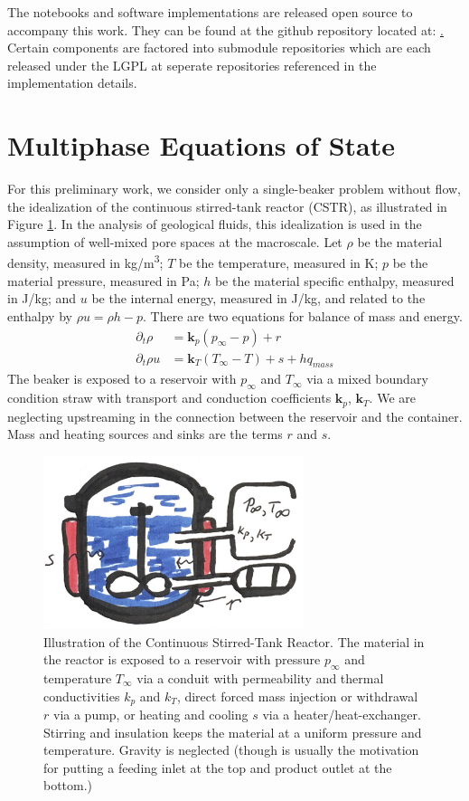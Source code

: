 \documentclass[]{article}
\begin{document}
The notebooks and software implementations are released open source to
accompany this work. They can be found at the github repository
located at: \href{https://github.com/afqueiruga/latentsim}.
Certain components are factored into submodule repositories which are
each released under the LGPL at seperate repositories referenced in
the implementation details.

\section{Multiphase Equations of State}


For this preliminary work, we consider only a single-beaker problem
without flow, the idealization of the continuous stirred-tank reactor (CSTR), as illustrated
in Figure \ref{fig:cstr}. 
In the analysis of geological fluids, this idealization is used in the
assumption of well-mixed pore spaces at the macroscale.  Let \(\rho\)
be the material density, measured in \si{kg/m^3}; \(T\) be the
temperature, measured in \si{K}; \(p\) be the material pressure,
measured in \si{Pa}; \(h\) be the material
specific enthalpy, measured in \si{J/kg}; and \(u\) be the internal
energy, measured in \si{J/kg}, and related to the enthalpy by  \(\rho u = \rho h - p\). There are two equations for
balance of mass and energy.
\begin{align}
\partial_t \rho & = \mathbf{k}_p(p_\infty - p) + r\\
\partial_t \rho u & = \mathbf{k}_T(T_\infty-T) + s + h q_{mass}
\end{align}
The beaker is exposed to a reservoir with \(p_\infty\) and \(T_\infty\)
via a mixed boundary condition straw with transport and conduction
coefficients \(\mathbf{k}_p\), \(\mathbf{k}_T\). 
We are neglecting upstreaming in the connection between the reservoir
and the container. Mass and heating
sources and sinks are the terms \(r\) and \(s\).


\begin{figure}
  \centering
  \includegraphics[width=3in]{../slides/cstr.png}
  \caption{ \label{fig:cstr} Illustration of the Continuous
    Stirred-Tank    
  Reactor. The material in the reactor is exposed to a reservoir with
  pressure
  $p_\infty$ and temperature $T_\infty$ via a conduit with permeability
  and thermal conductivities $k_p$ and $k_T$, direct forced mass
  injection or withdrawal $r$ via a pump, or heating and cooling $s$
  via a heater/heat-exchanger. Stirring and insulation keeps the
  material at a uniform pressure and temperature. Gravity is
  neglected (though is usually the motivation for putting a feeding inlet at
the top and product outlet at the bottom.)}
\end{figure}
\end{document}
